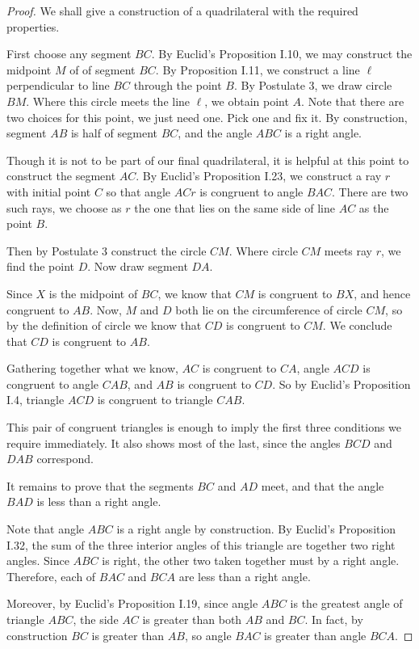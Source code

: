 \documentclass{tufte-handout}
\theoremstyle{definition}
\begin{document}
\begin{proof}
We shall give a construction of a quadrilateral with the required properties.

First choose any segment $BC$. By Euclid's Proposition I.10, we may construct the midpoint $M$ of of segment $BC$. By Proposition I.11, we construct a line $\ell$ perpendicular to line $BC$ through the point $B$. By Postulate 3, we draw circle $BM$. Where this circle meets the line $\ell$, we obtain point $A$. Note that there are two choices for this point, we just need one. Pick one and fix it. By construction, segment $AB$ is half of segment $BC$, and the angle $ABC$ is a right angle.

Though it is not to be part of our final quadrilateral, it is helpful at this point to construct the segment $AC$. By Euclid's Proposition I.23, we construct a ray $r$ with initial point $C$ so that angle $ACr$ is congruent to angle $BAC$. There are two such rays, we choose as $r$ the one that lies on the same side of line $AC$ as the point $B$.

Then by Postulate 3 construct the circle $CM$. Where circle $CM$ meets ray $r$, we find the point $D$. Now draw segment $DA$. 

Since $X$ is the midpoint of $BC$, we know that $CM$ is congruent to $BX$, and hence congruent to $AB$. Now, $M$ and $D$ both lie on the circumference of circle $CM$, so by the definition of circle we know that $CD$ is congruent to $CM$. We conclude that $CD$ is congruent to $AB$.

Gathering together what we know, $AC$ is congruent to $CA$, angle $ACD$ is congruent to angle $CAB$, and $AB$ is congruent to $CD$. So by Euclid's Proposition I.4, triangle $ACD$ is congruent to triangle $CAB$.

This pair of congruent triangles is enough to imply the first three conditions we require immediately. It also shows most of the last, since the angles $BCD$ and $DAB$ correspond.

It remains to prove that the segments $BC$ and $AD$ meet, and that the angle $BAD$ is less than a right angle.

Note that angle $ABC$ is a right angle by construction. By Euclid's Proposition I.32, the sum of the three interior angles of this triangle are together two right angles. Since $ABC$ is right, the other two taken together must by a right angle. Therefore, each of $BAC$ and $BCA$ are less than a right angle.

Moreover, by Euclid's Proposition I.19, since angle $ABC$ is the greatest angle of triangle $ABC$, the side $AC$ is greater than both $AB$ and $BC$. In fact, by construction $BC$ is greater than $AB$, so angle $BAC$ is greater than angle $BCA$.


\end{proof}
\end{document}
